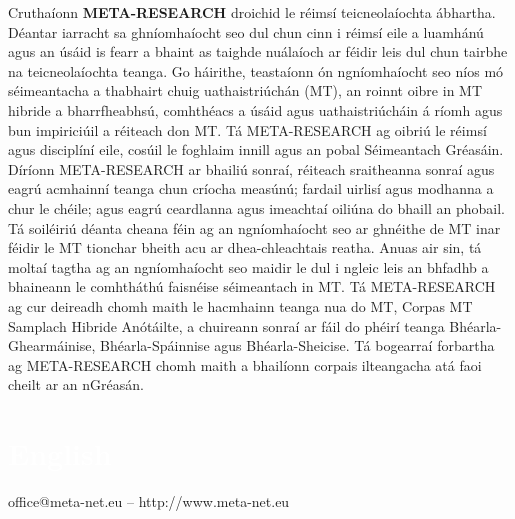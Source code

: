 \begin{multicols}{2}
Cruthaíonn \textbf{META-RESEARCH} droichid le réimsí teicneolaíochta ábhartha. Déantar iarracht sa ghníomhaíocht seo dul chun cinn i réimsí eile a luamhánú agus an úsáid is fearr a bhaint as taighde nuálaíoch ar féidir leis dul chun tairbhe na teicneolaíochta teanga. Go háirithe, teastaíonn ón ngníomhaíocht seo níos mó séimeantacha a thabhairt chuig uathaistriúchán (MT), an roinnt oibre in MT hibride a bharrfheabhsú, comhthéacs a úsáid agus uathaistriúcháin á ríomh agus bun impiriciúil a réiteach don MT. Tá META-RESEARCH ag oibriú le réimsí agus disciplíní eile, cosúil le foghlaim innill agus an pobal Séimeantach Gréasáin. Díríonn META-RESEARCH ar bhailiú sonraí, réiteach sraitheanna sonraí agus eagrú acmhainní teanga chun críocha measúnú; fardail uirlisí agus modhanna a chur le chéile; agus eagrú ceardlanna agus imeachtaí oiliúna do bhaill an phobail. Tá soiléiriú déanta cheana féin ag an ngníomhaíocht seo ar ghnéithe de MT inar féidir le MT tionchar bheith acu ar dhea-chleachtais reatha. Anuas air sin, tá moltaí tagtha ag an ngníomhaíocht seo maidir le dul i ngleic leis an bhfadhb a bhaineann le comhtháthú faisnéise séimeantach in MT. Tá META-RESEARCH ag cur deireadh chomh maith le hacmhainn teanga nua do MT, Corpas MT Samplach Hibride Anótáilte, a chuireann sonraí ar fáil do phéirí teanga Bhéarla-Ghearmáinise, Bhéarla-Spáinnise agus Bhéarla-Sheicise. Tá bogearraí forbartha ag META-RESEARCH chomh maith a bhailíonn corpais ilteangacha atá faoi cheilt ar an nGréasán.
\end{multicols}

\vfill

\makeatletter
{}
{
  \renewcommand*{\theHsection}{\thepart.\thesection}
}
\makeatother
\part*{\textcolor{white}{English}}
\setcounter{section}{0}
\setcounter{figure}{0}

\centerline{office@meta-net.eu -- http://www.meta-net.eu}


\cleardoublepage


